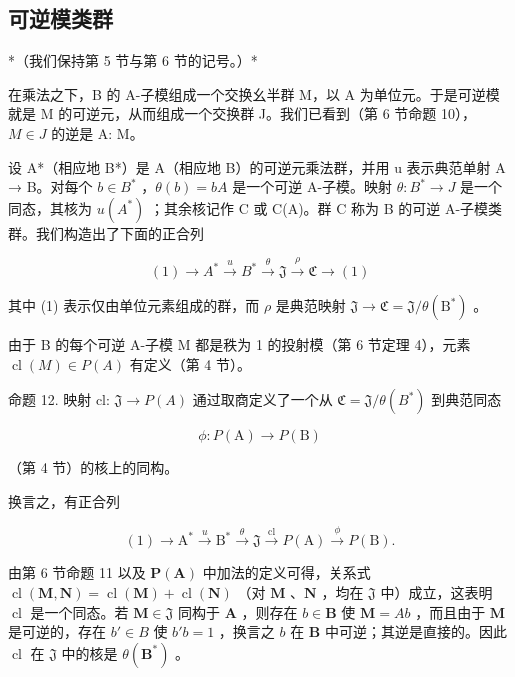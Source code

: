 \subsection{可逆模类群}

*（我们保持第 5 节与第 6 节的记号。）*

在乘法之下，B 的 A-子模组成一个交换幺半群 M，以 A 为单位元。于是可逆模就是 M 的可逆元，从而组成一个交换群 J。我们已看到（第 6 节命题 10），\(M \in J\) 的逆是 A: M。

设 A*（相应地 B*）是 A（相应地 B）的可逆元乘法群，并用 u 表示典范单射 A → B。对每个 \(b \in B^{*}\) ，\(\theta(b) = bA\) 是一个可逆 A-子模。映射 \(\theta: B^{*} \to J\) 是一个同态，其核为 \(u(A^{*})\) ；其余核记作 C 或 C(A)。群 C 称为 B 的可逆 A-子模类群。我们构造出了下面的正合列

\[
(1) \longrightarrow A ^ {*} \stackrel {u} {\longrightarrow} B ^ {*} \stackrel {\theta} {\longrightarrow} \mathfrak {J} \stackrel {\rho} {\longrightarrow} \mathfrak {C} \longrightarrow (1)\tag{10}
\]

其中 (1) 表示仅由单位元素组成的群，而 \(\rho\) 是典范映射 \(\mathfrak{J} \to \mathfrak{C} = \mathfrak{J}/\theta(\mathrm{B}^*)\) 。

由于 B 的每个可逆 A-子模 M 都是秩为 1 的投射模（第 6 节定理 4），元素 \(\operatorname{cl}(M) \in P(A)\) 有定义（第 4 节）。

命题 12. 映射 cl: \(\mathfrak{J} \to P(A)\) 通过取商定义了一个从 \(\mathfrak{C} = \mathfrak{J}/\theta(B^{*})\) 到典范同态

\[
\phi \colon P (\mathrm{A}) \to P (\mathrm{B})
\]

（第 4 节）的核上的同构。

换言之，有正合列

\[
(1) \longrightarrow \mathrm{A} ^ {*} \stackrel {u} {\longrightarrow} \mathrm{B} ^ {*} \stackrel {\theta} {\longrightarrow} \mathfrak {J} \stackrel {\mathrm{cl}} {\longrightarrow} P (\mathrm{A}) \stackrel {\phi} {\longrightarrow} P (\mathrm{B}).\tag{11}
\]

由第 6 节命题 11 以及 \(\mathbf{P}(\mathbf{A})\) 中加法的定义可得，关系式 \(\operatorname{cl}(\mathbf{M},\mathbf{N}) = \operatorname{cl}(\mathbf{M}) + \operatorname{cl}(\mathbf{N})\) （对 \(\mathbf{M}\) 、\(\mathbf{N}\) ，均在 \(\mathfrak{J}\) 中）成立，这表明 \(\operatorname{cl}\) 是一个同态。若 \(\mathbf{M} \in \mathfrak{J}\) 同构于 \(\mathbf{A}\) ，则存在 \(b \in \mathbf{B}\) 使 \(\mathbf{M} = Ab\) ，而且由于 \(\mathbf{M}\) 是可逆的，存在 \(b' \in B\) 使 \(b'b = 1\) ，换言之 \(b\) 在 \(\mathbf{B}\) 中可逆；其逆是直接的。因此 \(\operatorname{cl}\) 在 \(\mathfrak{J}\) 中的核是 \(\theta(\mathbf{B}^*)\) 。

